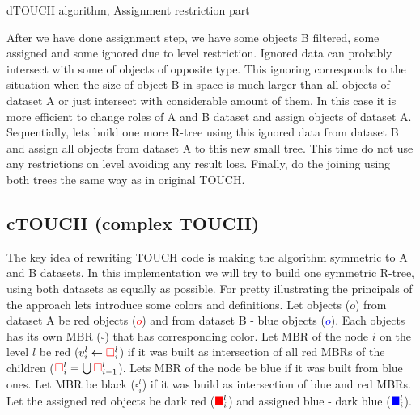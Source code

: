 \documentclass{sig-alternate}
\begin{document}
\begin{algorithm}
\caption{dTOUCH algorithm, Assignment restriction part}\label{touchcodeassign}
\begin{algorithmic}[1]
    \Loop
	\EndIf
	  \EndIf
	\EndIf
      \EndFor
    \EndLoop
  \EndFor
\EndFunction
\end{algorithmic}
\end{algorithm}

After we have done assignment step, we have some objects B filtered, some assigned and some ignored due to level restriction. Ignored data can probably intersect with some of objects of opposite type. This ignoring corresponds to the situation when the size of object B in space is much larger than all objects of dataset A or just intersect with considerable amount of them. In this case it is more efficient to change roles of A and B dataset and assign objects of dataset A. Sequentially, lets build one more R-tree using this ignored data from dataset B and assign all objects from dataset A to this new small tree. This time do not use any restrictions on level avoiding any result loss. Finally, do the joining using both trees the same way as in original TOUCH.

\subsection{cTOUCH (complex TOUCH)}
The key idea of rewriting TOUCH code is making the algorithm symmetric to A and B datasets. In this implementation we will try to build one symmetric R-tree, using both datasets as equally as possible. For pretty illustrating the principals of the approach lets introduce some colors and definitions. Let objects ($o$) from dataset A be red objects (\textcolor{red}{$o$}) and from dataset B - blue objects (\textcolor{blue}{$o$}). Each objects has its own MBR ($ \square $) that has corresponding color. Let MBR of the node $i$ on the level $l$ be red ($v^l_i \leftarrow \textcolor{red}{\square}^l_i$) if it was built as intersection of all red MBRs of the children ($\textcolor{red}{\square}^{l}_i = \bigcup\textcolor{red}{\square}^{l}_{i-1}$). Lets MBR of the node be blue if it was built from blue ones. Let MBR be black ($\square^{l}_i$) if it was build as intersection of blue and red MBRs. Let the assigned red objects be dark red ($\textcolor{red}{\blacksquare}^{l}_i$) and assigned blue - dark blue ($\textcolor{blue}{\blacksquare}^{l}_i$).
\end{document}
